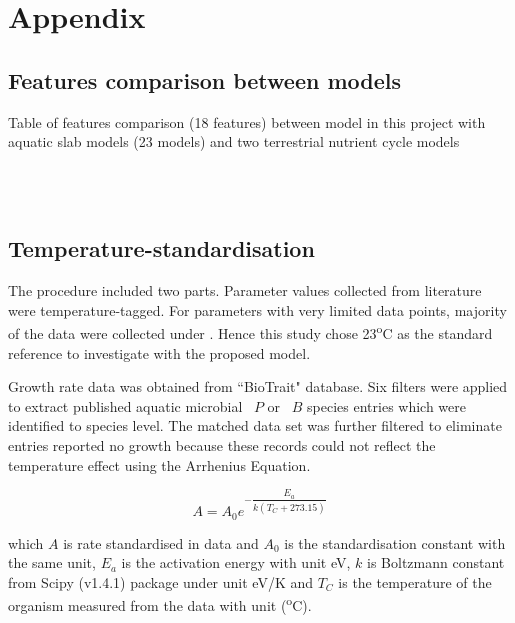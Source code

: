 \documentclass[../thesis.tex]{subfiles} %
\begin{document}
\section{Appendix}
\beginSupp

\subsection{Features comparison between models}
\begin{table}[H]
\begin{tiny}
    \centering
    \caption[Model features comparison]{Table of features comparison (18 features) between model in this project with aquatic slab models (23 models) and two terrestrial nutrient cycle models}
    \\
    \vspace{.5cm}
    \\
    \vspace{.5cm}
    \label{modComp}
\end{tiny}
\end{table}

\subsection{Temperature-standardisation}
The procedure included two parts.  Parameter values collected from literature were temperature-tagged.  For parameters with very limited data points, majority of the data were collected under \temp.  Hence this study chose 23\textsuperscript{o}C as the standard reference to investigate with the proposed model.

Growth rate data was obtained from ``BioTrait" database\autocite{della2013thermal}.  Six filters were applied to extract published aquatic microbial \phy\ $P$ or \bac\ $B$ species entries which were identified to species level.  The matched data set was further filtered to eliminate entries reported no growth because these records could not reflect the temperature effect using the Arrhenius Equation.

\begin{equation}
    A = A_0e^{-\dfrac{E_a}{k(T_C+273.15)}}
    \label{arrEq}
\end{equation}

which $A$ is rate standardised in data and $A_0$ is the standardisation constant with the same unit, $E_a$ is the activation energy with unit eV, $k$ is Boltzmann constant from Scipy (v1.4.1) package under unit eV/K and $T_C$ is the temperature of the organism measured from the data with unit (\textsuperscript{o}C).
\end{document}
